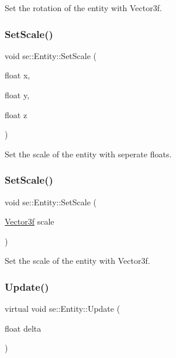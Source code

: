 Set the rotation of the entity with Vector3f. \mbox{\label{classse_1_1_entity_a812b63adcbf5f1a3e429a31c6e0ff940}} 
\subsubsection{\texorpdfstring{Set\+Scale()}{SetScale()}\hspace{0.1cm}{\footnotesize\ttfamily [1/2]}}
{\footnotesize\ttfamily void se\+::\+Entity\+::\+Set\+Scale (\begin{DoxyParamCaption}\item[{float}]{x,  }\item[{float}]{y,  }\item[{float}]{z }\end{DoxyParamCaption})}

Set the scale of the entity with seperate floats. \mbox{\label{classse_1_1_entity_a70df7cdf2d72ff4d767033c2994b673f}} 
\subsubsection{\texorpdfstring{Set\+Scale()}{SetScale()}\hspace{0.1cm}{\footnotesize\ttfamily [2/2]}}
{\footnotesize\ttfamily void se\+::\+Entity\+::\+Set\+Scale (\begin{DoxyParamCaption}\item[{\mbox{\hyperlink{namespacese_a12e07512d95e2fdebdaf74a5ea2cf5f6}{Vector3f}}}]{scale }\end{DoxyParamCaption})}

Set the scale of the entity with Vector3f. \mbox{\label{classse_1_1_entity_a1cd277c4c5a517f5cde8b72d5c40a8f0}} 
\subsubsection{\texorpdfstring{Update()}{Update()}}
{\footnotesize\ttfamily virtual void se\+::\+Entity\+::\+Update (\begin{DoxyParamCaption}\item[{float}]{delta }\end{DoxyParamCaption})\hspace{0.3cm}{\ttfamily [virtual]}}

